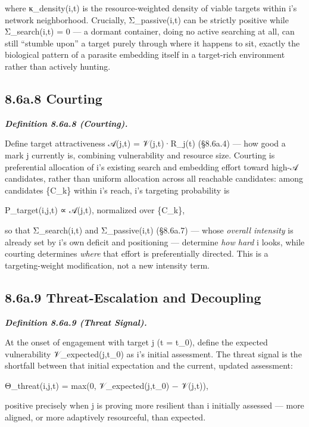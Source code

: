 \documentclass[
]{article}
\begin{document}
where κ\_density(i,t) is the resource-weighted density of viable targets
within i's network neighborhood. Crucially, Σ\_passive(i,t) can be
strictly positive while Σ\_search(i,t) = 0 --- a dormant container,
doing no active searching at all, can still ``stumble upon'' a target
purely through where it happens to sit, exactly the biological pattern
of a parasite embedding itself in a target-rich environment rather than
actively hunting.

\hypertarget{a.8-courting}{%
\subsection{8.6a.8 Courting}\label{a.8-courting}}

\emph{\textbf{Definition 8.6a.8 (Courting).}}

Define target attractiveness 𝒜(j,t) = 𝒱(j,t)·R\_j(t) (§8.6a.4) --- how
good a mark j currently is, combining vulnerability and resource size.
Courting is preferential allocation of i's existing search and embedding
effort toward high-𝒜 candidates, rather than uniform allocation across
all reachable candidates: among candidates \{C\_k\} within i's reach,
i's targeting probability is

P\_target(i,j,t) ∝ 𝒜(j,t), normalized over \{C\_k\},

so that Σ\_search(i,t) and Σ\_passive(i,t) (§8.6a.7) --- whose
\emph{overall intensity} is already set by i's own deficit and
positioning --- determine \emph{how hard} i looks, while courting
determines \emph{where} that effort is preferentially directed. This is
a targeting-weight modification, not a new intensity term.

\hypertarget{a.9-threat-escalation-and-decoupling}{%
\subsection{8.6a.9 Threat-Escalation and
Decoupling}\label{a.9-threat-escalation-and-decoupling}}

\emph{\textbf{Definition 8.6a.9 (Threat Signal).}}

At the onset of engagement with target j (t = t\_0), define the expected
vulnerability 𝒱\_expected(j,t\_0) as i's initial assessment. The threat
signal is the shortfall between that initial expectation and the
current, updated assessment:

Θ\_threat(i,j,t) = max(0, 𝒱\_expected(j,t\_0) − 𝒱(j,t)),

positive precisely when j is proving more resilient than i initially
assessed --- more aligned, or more adaptively resourceful, than
expected.
\end{document}

